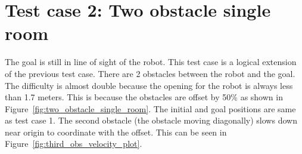 \section{Test case 2: Two obstacle single room}%
\label{sec:test_case_2_two_obstacle_single_room}
    The goal is still in line of sight of the robot. This test case is a logical extension of
    the previous test case. There are 2 obstacles between the robot and the goal. The difficulty
    is almost double because the opening for the robot is always less than 1.7 meters. This is 
    because the obstacles are offset by 50\% as shown in Figure~\ref{fig:two_obstacle_single_room}.
    The initial and goal positions are same as test case 1. The second obstacle (the obstacle moving 
    diagonally) slows down near origin to coordinate with the offset. This can be seen in Figure~\ref{fig:third_obs_velocity_plot}.

